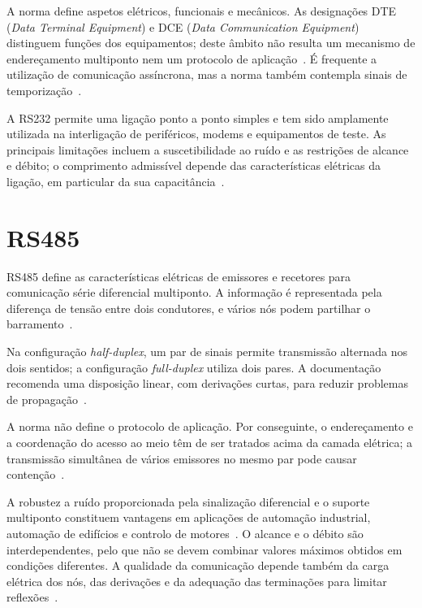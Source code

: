 A norma define aspetos elétricos, funcionais e mecânicos. As designações
DTE (\textit{Data Terminal Equipment}) e DCE (\textit{Data Communication
Equipment}) distinguem funções dos equipamentos; deste âmbito não resulta
um mecanismo de endereçamento multiponto nem um protocolo de
aplicação~\cite[sec.~2]{dodson_rs232_2023}.
É frequente a utilização de comunicação assíncrona, mas a norma também
contempla sinais de temporização~\cite{ti_rs232_2002,dodson_rs232_2023}.

A RS232 permite uma ligação ponto a ponto simples e tem sido amplamente
utilizada na interligação de periféricos, modems e equipamentos de teste.
As principais limitações incluem a suscetibilidade ao ruído e as restrições de alcance e débito;
o comprimento admissível depende das características elétricas da
ligação, em particular da sua
capacitância~\cite{ti_rs232_2002,dodson_rs232_2023}.

\section{RS485}

RS485 define as características elétricas de emissores e recetores para
comunicação série diferencial multiponto. A informação é representada
pela diferença de tensão entre dois condutores, e vários nós podem
partilhar o barramento~\cite{stiller_rs485_2015,ti_rs485_an1057_2013}.

Na configuração \textit{half-duplex}, um par de sinais permite transmissão
alternada nos dois sentidos; a configuração \textit{full-duplex} utiliza
dois pares. A documentação recomenda uma disposição linear, com
derivações curtas, para reduzir problemas de
propagação~\cite[secs.~2 e~3]{ti_rs485_an1057_2013}.

A norma não define o protocolo de aplicação. Por conseguinte, o
endereçamento e a coordenação do acesso ao meio têm de ser tratados
acima da camada elétrica; a transmissão simultânea de vários emissores
no mesmo par pode causar contenção~\cite[secs.~1 e~10]{ti_rs485_an1057_2013}.

A robustez a ruído proporcionada pela sinalização diferencial e o suporte
multiponto constituem vantagens em aplicações de automação industrial,
automação de edifícios e controlo de motores~\cite{stiller_rs485_2015}.
O alcance e o débito são interdependentes, pelo que não se devem combinar
valores máximos obtidos em condições diferentes. A qualidade da comunicação
depende também da carga elétrica dos nós, das derivações e da adequação
das terminações para limitar reflexões~\cite[secs.~2 e~5--7]{ti_rs485_an1057_2013}.

